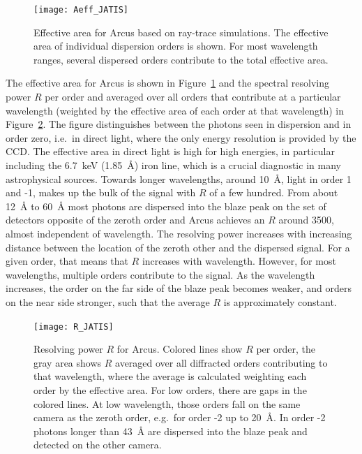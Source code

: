\documentclass[12pt]{spieman}  %
\begin{document}
\begin{spacing}{2}
\begin{figure}
    \centering
    \texttt{[image: Aeff\_JATIS]}
    \caption {\label{fig:Aeff}
        Effective area for Arcus based on ray-trace simulations. The effective area of individual dispersion orders is shown. For most wavelength ranges, several dispersed orders contribute to the total effective area.
    }
\end{figure}

The effective area for Arcus is shown in Figure~\ref{fig:Aeff} and the spectral resolving power $R$ per order and averaged over all orders that contribute at a particular wavelength (weighted by the effective area of each order at that wavelength) in Figure~\ref{fig:R}. The figure distinguishes between the photons seen in dispersion and in order zero, i.e.\ in direct light, where the only energy resolution is provided by the CCD. The effective area in direct light is high for high energies, in particular including the 6.7~keV (1.85~\AA{}) iron line, which is a crucial diagnostic in many astrophysical sources. Towards longer wavelengths, around 10~\AA{}, light in order 1 and -1, makes up the bulk of the signal with $R$ of a few hundred. From about 12~\AA{} to 60~\AA{} most photons are dispersed into the blaze peak on the set of detectors opposite of the zeroth order and Arcus achieves an $R$ around 3500, almost independent of wavelength. The resolving power increases with increasing distance between the location of the zeroth other and the dispersed signal. For a given order, that means that $R$ increases with wavelength. However, for most wavelengths, multiple orders contribute to the signal. As the wavelength increases, the order on the far side of the blaze peak becomes weaker, and orders on the near side stronger, such that the average $R$ is approximately constant.


\begin{figure}
    \centering
    \texttt{[image: R\_JATIS]}

    \caption {\label{fig:R}
    Resolving power $R$ for Arcus. Colored lines show $R$ per order, the gray area shows $R$ averaged over all diffracted orders contributing to that wavelength, where the average is calculated weighting each order by the effective area. For low orders, there are gaps in the colored lines. At low wavelength, those orders fall on the same camera as the zeroth order, e.g.\ for order -2 up to 20~\AA{}. In order -2 photons longer than 43~\AA{} are dispersed into the blaze peak and detected on the other camera.
    }
\end{figure}


\end{spacing}
\end{document}
